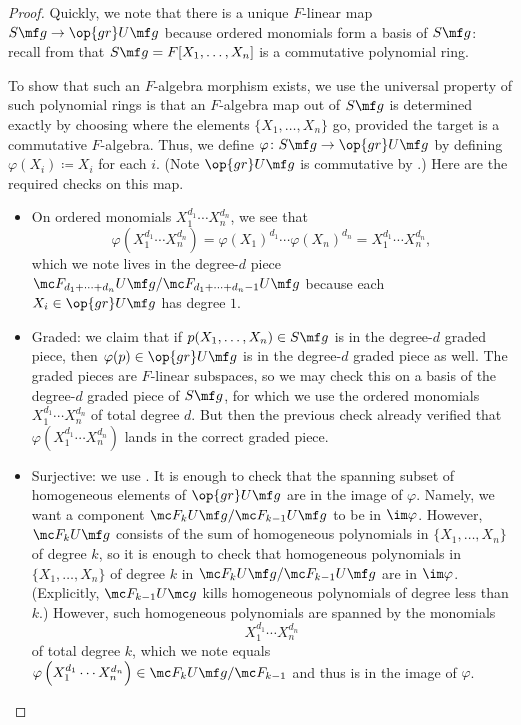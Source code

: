 \documentclass[../notes.tex]{subfiles}
\begin{document}
\begin{proof}
	Quickly, we note that there is a unique $F$-linear map $S\mf g\to\op{gr}U\mf g$ because ordered monomials form a basis of $S\mf g$: recall from  that $S\mf g=F[X_1,\ldots,X_n]$ is a commutative polynomial ring.
	
	To show that such an $F$-algebra morphism exists, we use the universal property of such polynomial rings is that an $F$-algebra map out of $S\mf g$ is determined exactly by choosing where the elements $\{X_1,\ldots,X_n\}$ go, provided the target is a commutative $F$-algebra. Thus, we define $\varphi\colon S\mf g\to\op{gr}U\mf g$ by defining $\varphi(X_i)\coloneqq X_i$ for each $i$. (Note $\op{gr}U\mf g$ is commutative by .) Here are the required checks on this map.
	\begin{itemize}
		\item On ordered monomials $X_1^{d_1}\cdots X_n^{d_n}$, we see that
		\[\varphi\left(X_1^{d_1}\cdots X_n^{d_n}\right)=\varphi(X_1)^{d_1}\cdots\varphi(X_n)^{d_n}=X_1^{d_1}\cdots X_n^{d_n},\]
		which we note lives in the degree-$d$ piece $\mc F_{d_1+\cdots+d_n}U\mf g/\mc F_{d_1+\cdots+d_n-1}U\mf g$ because each $X_i\in\op{gr}U\mf g$ has degree $1$.
		\item Graded: we claim that if $p(X_1,\ldots,X_n)\in S\mf g$ is in the degree-$d$ graded piece, then $\varphi(p)\in\op{gr}U\mf g$ is in the degree-$d$ graded piece as well. The graded pieces are $F$-linear subspaces, so we may check this on a basis of the degree-$d$ graded piece of $S\mf g$, for which we use the ordered monomials $X_1^{d_1}\cdots X_n^{d_n}$ of total degree $d$. But then the previous check already verified that $\varphi\left(X_1^{d_1}\cdots X_n^{d_n}\right)$ lands in the correct graded piece.
		\item Surjective: we use . It is enough to check that the spanning subset of homogeneous elements of $\op{gr}U\mf g$ are in the image of $\varphi$. Namely, we want a component $\mc F_kU\mf g/\mc F_{k-1}U\mf g$ to be in $\im\varphi$. However, $\mc F_kU\mf g$ consists of the sum of homogeneous polynomials in $\{X_1,\ldots,X_n\}$ of degree $k$, so it is enough to check that homogeneous polynomials in $\{X_1,\ldots,X_n\}$ of degree $k$ in $\mc F_kU\mf g/\mc F_{k-1}U\mf g$ are in $\im\varphi$. (Explicitly, $\mc F_{k-1}U\mc g$ kills homogeneous polynomials of degree less than $k$.) However, such homogeneous polynomials are spanned by the monomials
		\[X_1^{d_1}\cdots X_n^{d_n}\]
		of total degree $k$, which we note equals $\varphi\left(X_1^{d_1}\cdots X_n^{d_n}\right)\in\mc F_kU\mf g/\mc F_{k-1}$ and thus is in the image of $\varphi$.

\end{itemize}
\end{proof}
\end{document}
